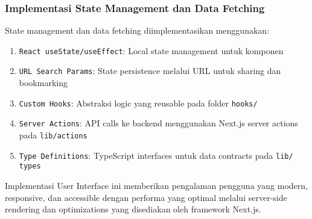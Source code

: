 \subsubsection{Implementasi State Management dan Data Fetching}

State management dan data fetching diimplementasikan menggunakan:

\begin{enumerate}
    \item \texttt{React useState/useEffect}: Local state management untuk komponen
    \item \texttt{URL Search Params}: State persistence melalui URL untuk sharing dan bookmarking
    \item \texttt{Custom Hooks}: Abstraksi logic yang reusable pada folder \texttt{hooks/}
    \item \texttt{Server Actions}: API calls ke backend menggunakan Next.js server actions pada \texttt{lib/actions}
    \item \texttt{Type Definitions}: TypeScript interfaces untuk data contracts pada \texttt{lib/\\types}
\end{enumerate}

Implementasi User Interface ini memberikan pengalaman pengguna yang modern, responsive, dan accessible dengan performa yang optimal melalui server-side rendering dan optimizations yang disediakan oleh framework Next.js.